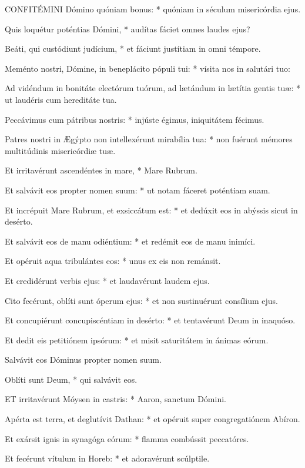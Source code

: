 
\lettrine[lines=2]{C}{ONFITÉMINI} Dómino quóniam bonus: * quóniam in séculum misericórdia ejus.

Quis loquétur poténtias Dómini, * audítas fáciet omnes laudes ejus?

Beáti, qui custódiunt judícium, * et fáciunt justítiam in omni témpore.

Meménto nostri, Dómine, in beneplácito pópuli tui: * vísita nos in salutári tuo:

Ad vidéndum in bonitáte electórum tuórum, ad lætándum in lætítia gentis tuæ: * ut laudéris cum hereditáte tua.

Peccávimus cum pátribus nostris: * injúste égimus, iniquitátem fécimus.

Patres nostri in Ægýpto non intellexérunt mirabília tua: * non fuérunt mémores multitúdinis misericórdiæ tuæ.

Et irritavérunt ascendéntes in mare, * Mare Rubrum.

Et salvávit eos propter nomen suum: * ut notam fáceret poténtiam suam.

Et incrépuit Mare Rubrum, et exsiccátum est: * et dedúxit eos in abýssis sicut in desérto.

Et salvávit eos de manu odiéntium: * et redémit eos de manu inimíci.

Et opéruit aqua tribulántes eos: * unus ex eis non remánsit.

Et credidérunt verbis ejus: * et laudavérunt laudem ejus.

Cito fecérunt, oblíti sunt óperum ejus: * et non sustinuérunt consílium ejus.

Et concupiérunt concupiscéntiam in desérto: * et tentavérunt Deum in inaquóso.

Et dedit eis petitiónem ipsórum: * et misit saturitátem in ánimas eórum.

 Salvávit eos Dóminus propter nomen suum.

 Oblíti sunt Deum, * qui salvávit eos.


\lettrine[lines=2]{E}{T} irritavérunt Móysen in castris: * Aaron, sanctum Dómini.

Apérta est terra, et deglutívit Dathan: * et opéruit super congregatiónem Abíron.

Et exársit ignis in synagóga eórum: * flamma combússit peccatóres.

Et fecérunt vítulum in Horeb: * et adoravérunt scúlptile.

